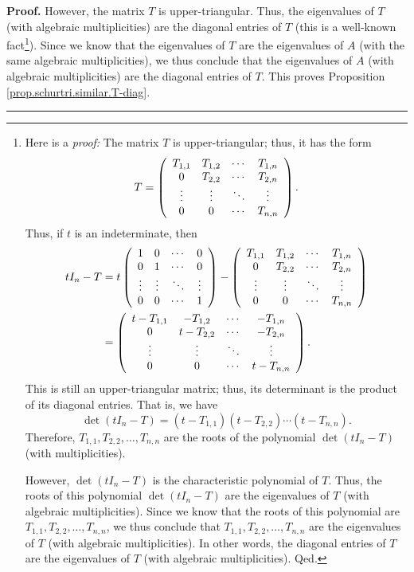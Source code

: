 \documentclass[numbers=enddot,12pt,final,onecolumn,notitlepage]{scrartcl}%
\numberwithin{exer}{subsection}
\theoremstyle{definition}
\newenvironment{proof}[1][Proof]{\noindent\textbf{#1.} }{\ \rule{0.5em}{0.5em}}
\begin{document}
\begin{proof}
However, the matrix $T$ is upper-triangular. Thus, the eigenvalues of $T$
(with algebraic multiplicities) are the diagonal entries of $T$ (this is a
well-known fact\footnote{Here is a \textit{proof:} The matrix $T$ is
upper-triangular; thus, it has the form
\[
T=\left(
\begin{array}
[c]{cccc}%
T_{1,1} & T_{1,2} & \cdots & T_{1,n}\\
0 & T_{2,2} & \cdots & T_{2,n}\\
\vdots & \vdots & \ddots & \vdots\\
0 & 0 & \cdots & T_{n,n}%
\end{array}
\right)  .
\]
Thus, if $t$ is an indeterminate, then
\begin{align*}
tI_{n}-T  &  =t\left(
\begin{array}
[c]{cccc}%
1 & 0 & \cdots & 0\\
0 & 1 & \cdots & 0\\
\vdots & \vdots & \ddots & \vdots\\
0 & 0 & \cdots & 1
\end{array}
\right)  -\left(
\begin{array}
[c]{cccc}%
T_{1,1} & T_{1,2} & \cdots & T_{1,n}\\
0 & T_{2,2} & \cdots & T_{2,n}\\
\vdots & \vdots & \ddots & \vdots\\
0 & 0 & \cdots & T_{n,n}%
\end{array}
\right) \\
&  =\left(
\begin{array}
[c]{cccc}%
t-T_{1,1} & -T_{1,2} & \cdots & -T_{1,n}\\
0 & t-T_{2,2} & \cdots & -T_{2,n}\\
\vdots & \vdots & \ddots & \vdots\\
0 & 0 & \cdots & t-T_{n,n}%
\end{array}
\right)  .
\end{align*}
This is still an upper-triangular matrix; thus, its determinant is the product
of its diagonal entries. That is, we have%
\[
\det\left(  tI_{n}-T\right)  =\left(  t-T_{1,1}\right)  \left(  t-T_{2,2}%
\right)  \cdots\left(  t-T_{n,n}\right)  .
\]
Therefore, $T_{1,1},T_{2,2},\ldots,T_{n,n}$ are the roots of the polynomial
$\det\left(  tI_{n}-T\right)  $ (with multiplicities).
\par
However, $\det\left(  tI_{n}-T\right)  $ is the characteristic polynomial of
$T$. Thus, the roots of this polynomial $\det\left(  tI_{n}-T\right)  $ are
the eigenvalues of $T$ (with algebraic multiplicities). Since we know that the
roots of this polynomial are $T_{1,1},T_{2,2},\ldots,T_{n,n}$, we thus
conclude that $T_{1,1},T_{2,2},\ldots,T_{n,n}$ are the eigenvalues of $T$
(with algebraic multiplicities). In other words, the diagonal entries of $T$
are the eigenvalues of $T$ (with algebraic multiplicities). Qed.}). Since we
know that the eigenvalues of $T$ are the eigenvalues of $A$ (with the same
algebraic multiplicities), we thus conclude that the eigenvalues of $A$ (with
algebraic multiplicities) are the diagonal entries of $T$. This proves
Proposition \ref{prop.schurtri.similar.T-diag}.
\end{proof}
\end{document}

